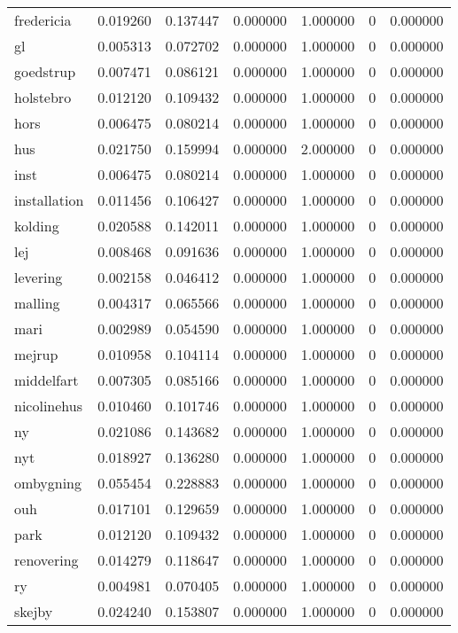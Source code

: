 \begin{landscape}
\begin{longtable}[h!]{lrrllrr}
fredericia & 0.019260 & 0.137447 & 0.000000 & 1.000000 & 0 & 0.000000 \\
gl & 0.005313 & 0.072702 & 0.000000 & 1.000000 & 0 & 0.000000 \\
goedstrup & 0.007471 & 0.086121 & 0.000000 & 1.000000 & 0 & 0.000000 \\
holstebro & 0.012120 & 0.109432 & 0.000000 & 1.000000 & 0 & 0.000000 \\
hors & 0.006475 & 0.080214 & 0.000000 & 1.000000 & 0 & 0.000000 \\
hus & 0.021750 & 0.159994 & 0.000000 & 2.000000 & 0 & 0.000000 \\
inst & 0.006475 & 0.080214 & 0.000000 & 1.000000 & 0 & 0.000000 \\
installation & 0.011456 & 0.106427 & 0.000000 & 1.000000 & 0 & 0.000000 \\
kolding & 0.020588 & 0.142011 & 0.000000 & 1.000000 & 0 & 0.000000 \\
lej & 0.008468 & 0.091636 & 0.000000 & 1.000000 & 0 & 0.000000 \\
levering & 0.002158 & 0.046412 & 0.000000 & 1.000000 & 0 & 0.000000 \\
malling & 0.004317 & 0.065566 & 0.000000 & 1.000000 & 0 & 0.000000 \\
mari & 0.002989 & 0.054590 & 0.000000 & 1.000000 & 0 & 0.000000 \\
mejrup & 0.010958 & 0.104114 & 0.000000 & 1.000000 & 0 & 0.000000 \\
middelfart & 0.007305 & 0.085166 & 0.000000 & 1.000000 & 0 & 0.000000 \\
nicolinehus & 0.010460 & 0.101746 & 0.000000 & 1.000000 & 0 & 0.000000 \\
ny & 0.021086 & 0.143682 & 0.000000 & 1.000000 & 0 & 0.000000 \\
nyt & 0.018927 & 0.136280 & 0.000000 & 1.000000 & 0 & 0.000000 \\
ombygning & 0.055454 & 0.228883 & 0.000000 & 1.000000 & 0 & 0.000000 \\
ouh & 0.017101 & 0.129659 & 0.000000 & 1.000000 & 0 & 0.000000 \\
park & 0.012120 & 0.109432 & 0.000000 & 1.000000 & 0 & 0.000000 \\
renovering & 0.014279 & 0.118647 & 0.000000 & 1.000000 & 0 & 0.000000 \\
ry & 0.004981 & 0.070405 & 0.000000 & 1.000000 & 0 & 0.000000 \\
skejby & 0.024240 & 0.153807 & 0.000000 & 1.000000 & 0 & 0.000000 \\

\end{longtable}
\end{landscape}
